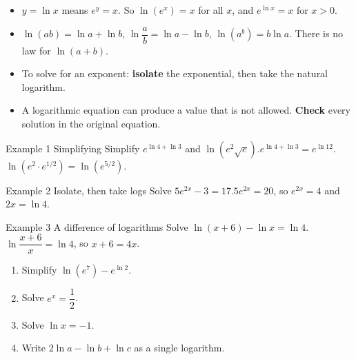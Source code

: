 \documentclass[11pt]{article}
\begin{document}

\begin{ideabox}
\begin{itemize}[leftmargin=*,itemsep=2pt,topsep=2pt]
  \item $y=\ln x$ means $e^{y}=x$. So $\ln\!\left(e^{x}\right)=x$ for all $x$, and $e^{\ln x}=x$ for $x>0$.
  \item $\ln(ab)=\ln a+\ln b$, \quad $\ln\dfrac ab=\ln a-\ln b$, \quad $\ln\!\left(a^{b}\right)=b\ln a$. There is no law for $\ln(a+b)$.
  \item To solve for an exponent: \textbf{isolate} the exponential, then take the natural logarithm.
  \item A logarithmic equation can produce a value that is not allowed. \textbf{Check} every solution in the original equation.
\end{itemize}
\end{ideabox}

\begin{example}{Example 1 \textperiodcentered{} Simplifying}
Simplify $e^{\ln4+\ln3}$ and $\ln\!\left(e^{2}\sqrt{e}\right)$.\soln $e^{\ln4+\ln3}=e^{\ln12}$. $\ln\!\left(e^{2}\cdot e^{1/2}\right)=\ln\!\left(e^{5/2}\right)$.
\end{example}

\begin{example}{Example 2 \textperiodcentered{} Isolate, then take logs}
Solve $5e^{2x}-3=17$.\soln $5e^{2x}=20$, so $e^{2x}=4$ and $2x=\ln4$.
\end{example}

\begin{example}{Example 3 \textperiodcentered{} A difference of logarithms}
Solve $\ln(x+6)-\ln x=\ln4$.\soln $\ln\dfrac{x+6}{x}=\ln4$, so $x+6=4x$.
\end{example}

\newpage
{}

\begin{enumerate}[leftmargin=*,itemsep=2pt]
  \item Simplify $\ln\!\left(e^{7}\right)-e^{\ln2}$.\work{2.3cm}
  \item Solve $e^{x}=\dfrac12$.\work{2.3cm}
  \item Solve $\ln x=-1$.\work{2.3cm}
  \item Write $2\ln a-\ln b+\ln c$ as a single logarithm.\work{2.3cm}
\end{enumerate}
\end{document}
